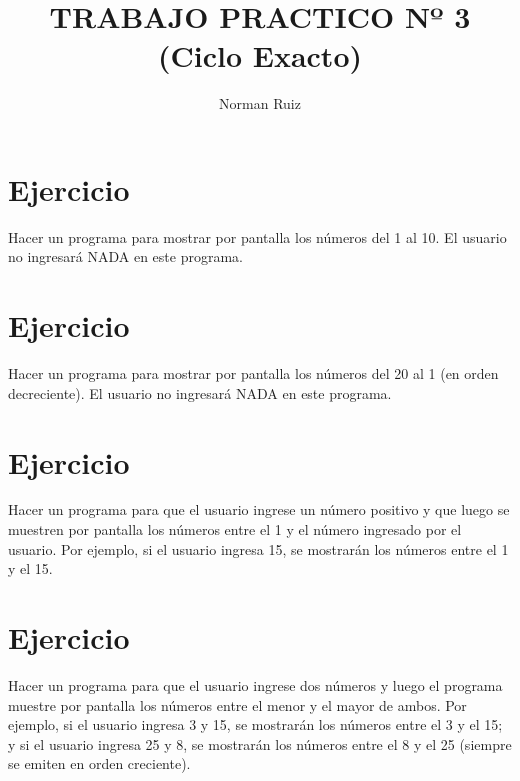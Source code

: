 \documentclass[12pt,a4paper,twoside]{article}
\author{Norman Ruiz}
\title{TRABAJO PRACTICO \linebreak Nº 3 \linebreak (Ciclo Exacto)}
\begin{document}
\maketitle
\newpage

\tableofcontents
\newpage

\section{Ejercicio }

\hspace*{1cm}Hacer un programa para mostrar por pantalla los números del 1 al 10. El usuario no ingresará NADA en este programa.

\newpage

\section{Ejercicio }

\hspace*{1cm}Hacer un programa para mostrar por pantalla los números del 20 al 1 (en orden decreciente). El usuario no ingresará NADA en este programa.

\newpage

\section{Ejercicio }

\hspace*{1cm}Hacer un programa para que el usuario ingrese un número positivo y que luego se muestren por pantalla los números entre el 1 y el número ingresado por el usuario. Por ejemplo, si el usuario ingresa 15, se mostrarán los números entre el 1 y el 15.

\newpage

\section{Ejercicio }

\hspace*{1cm}Hacer un programa para que el usuario ingrese dos números y luego el programa muestre por pantalla los números entre el menor y el mayor de ambos. Por ejemplo, si el usuario ingresa 3 y 15, se mostrarán los números entre el 3 y el 15; y si el usuario ingresa 25 y 8, se mostrarán los números entre el 8 y el 25 (siempre se emiten en orden creciente).
\end{document}
